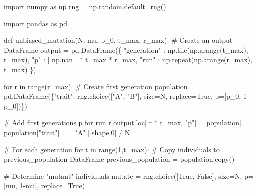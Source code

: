 \documentclass[
  a4paperpaper,
  ,captions=tableheading
]{scrbook}
\newenvironment{Shaded}{\begin{snugshade}}{\end{snugshade}}
\newcommand{\BuiltInTok}[1]{\textcolor[rgb]{0.00,0.23,0.31}{#1}}
\newcommand{\CommentTok}[1]{\textcolor[rgb]{0.37,0.37,0.37}{#1}}
\newcommand{\ControlFlowTok}[1]{\textcolor[rgb]{0.00,0.23,0.31}{#1}}
\newcommand{\DecValTok}[1]{\textcolor[rgb]{0.68,0.00,0.00}{#1}}
\newcommand{\ImportTok}[1]{\textcolor[rgb]{0.00,0.46,0.62}{#1}}
\newcommand{\KeywordTok}[1]{\textcolor[rgb]{0.00,0.23,0.31}{#1}}
\newcommand{\NormalTok}[1]{\textcolor[rgb]{0.00,0.23,0.31}{#1}}
\newcommand{\OperatorTok}[1]{\textcolor[rgb]{0.37,0.37,0.37}{#1}}
\newcommand{\StringTok}[1]{\textcolor[rgb]{0.13,0.47,0.30}{#1}}
\newcommand{\VariableTok}[1]{\textcolor[rgb]{0.07,0.07,0.07}{#1}}
\begin{document}
\begin{Shaded}
\begin{Highlighting}[]
\ImportTok{import}\NormalTok{ numpy }\ImportTok{as}\NormalTok{ np}
\NormalTok{rng }\OperatorTok{=}\NormalTok{ np.random.default\_rng()}

\ImportTok{import}\NormalTok{ pandas }\ImportTok{as}\NormalTok{ pd}
\end{Highlighting}
\end{Shaded}

\begin{Shaded}
\begin{Highlighting}[]
\KeywordTok{def}\NormalTok{ unbiased\_mutation(N, mu, p\_0, t\_max, r\_max):}
    \CommentTok{\# Create an output DataFrame}
\NormalTok{    output }\OperatorTok{=}\NormalTok{ pd.DataFrame(\{}
        \StringTok{"generation"}\NormalTok{ : np.tile(np.arange(t\_max), r\_max),}
        \StringTok{"p"}\NormalTok{ : [ np.nan ] }\OperatorTok{*}\NormalTok{ t\_max }\OperatorTok{*}\NormalTok{ r\_max,}
        \StringTok{"run"}\NormalTok{ : np.repeat(np.arange(r\_max), t\_max)}
\NormalTok{    \})}

    \ControlFlowTok{for}\NormalTok{ r }\KeywordTok{in} \BuiltInTok{range}\NormalTok{(r\_max):}
        \CommentTok{\# Create first generation}
\NormalTok{        population }\OperatorTok{=}\NormalTok{ pd.DataFrame(\{}\StringTok{"trait"}\NormalTok{: rng.choice([}\StringTok{"A"}\NormalTok{, }\StringTok{"B"}\NormalTok{], size}\OperatorTok{=}\NormalTok{N, replace}\OperatorTok{=}\VariableTok{True}\NormalTok{, p}\OperatorTok{=}\NormalTok{[p\_0, }\DecValTok{1} \OperatorTok{{-}}\NormalTok{ p\_0])\})}

        \CommentTok{\# Add first generation\textquotesingle{}s p for run r}
\NormalTok{        output.loc[ r }\OperatorTok{*}\NormalTok{ t\_max, }\StringTok{"p"}\NormalTok{] }\OperatorTok{=}\NormalTok{ population[ population[}\StringTok{"trait"}\NormalTok{] }\OperatorTok{==} \StringTok{"A"}\NormalTok{ ].shape[}\DecValTok{0}\NormalTok{] }\OperatorTok{/}\NormalTok{ N}

        \CommentTok{\# For each generation }
        \ControlFlowTok{for}\NormalTok{ t }\KeywordTok{in} \BuiltInTok{range}\NormalTok{(}\DecValTok{1}\NormalTok{,t\_max):}
            \CommentTok{\# Copy individuals to previous\_population DataFrame}
\NormalTok{            previous\_population }\OperatorTok{=}\NormalTok{ population.copy()}
            
            \CommentTok{\# Determine "mutant" individuals}
\NormalTok{            mutate }\OperatorTok{=}\NormalTok{ rng.choice([}\VariableTok{True}\NormalTok{, }\VariableTok{False}\NormalTok{], size}\OperatorTok{=}\NormalTok{N, p}\OperatorTok{=}\NormalTok{[mu, }\DecValTok{1}\OperatorTok{{-}}\NormalTok{mu], replace}\OperatorTok{=}\VariableTok{True}\NormalTok{)}


\end{Highlighting}
\end{Shaded}
\end{document}
